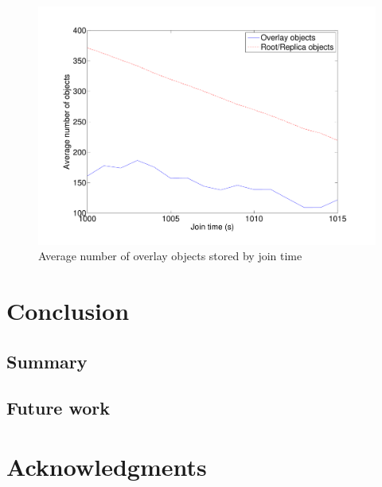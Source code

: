 \documentclass[10pt,a4paper,conference]{IEEEtran}
\begin{document}
\begin{figure}[htbp]
 \centering
 \includegraphics[clip=true, viewport=2cm 1cm 27.5cm 19.5cm, width=\columnwidth]{ObjectsByJoinTime}
 \caption{Average number of overlay objects stored by join time}
 \label{fig_objects_by_jointime}
\end{figure}
%


\section{Conclusion}
\label{conclusion}

\subsection{Summary}

\subsection{Future work}


\ifCLASSOPTIONcompsoc
  \section*{Acknowledgments}
\else
\end{document}
